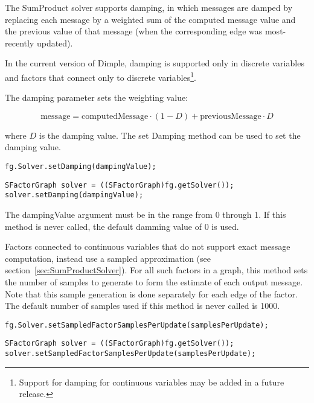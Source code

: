 

The SumProduct solver supports damping, in which messages are damped by replacing each message by a weighted sum of the computed message value and the previous value of that message (when the corresponding edge was most-recently updated).

In the current version of Dimple, damping is supported only in discrete variables and factors that connect only to discrete variables\footnote{Support for damping for continuous variables may be added in a future release.}.

The damping parameter sets the weighting value:

\[
\mathrm{message} = \mathrm{computedMessage} \cdot (1 - D) + \mathrm{previousMessage} \cdot D
\]

where $D$ is the damping value.  The set Damping method can be used to set the damping value.

\ifmatlab
\begin{lstlisting}
fg.Solver.setDamping(dampingValue);
\end{lstlisting}
\fi

\ifjava
\begin{lstlisting}
SFactorGraph solver = ((SFactorGraph)fg.getSolver());
solver.setDamping(dampingValue);
\end{lstlisting}
\fi

The dampingValue argument must be in the range from 0 through 1.  If this method is never called, the default damming value of 0 is used.


Factors connected to continuous variables that do not support exact message computation, instead use a sampled approximation (see section~\ref{sec:SumProductSolver}).  For all such factors in a graph, this method sets the number of samples to generate to form the estimate of each output message.  Note that this sample generation is done separately for each edge of the factor.  The default number of samples used if this method is never called is 1000.

\ifmatlab
\begin{lstlisting}
fg.Solver.setSampledFactorSamplesPerUpdate(samplesPerUpdate);
\end{lstlisting}
\fi

\ifjava
\begin{lstlisting}
SFactorGraph solver = ((SFactorGraph)fg.getSolver());
solver.setSampledFactorSamplesPerUpdate(samplesPerUpdate);
\end{lstlisting}
\fi


